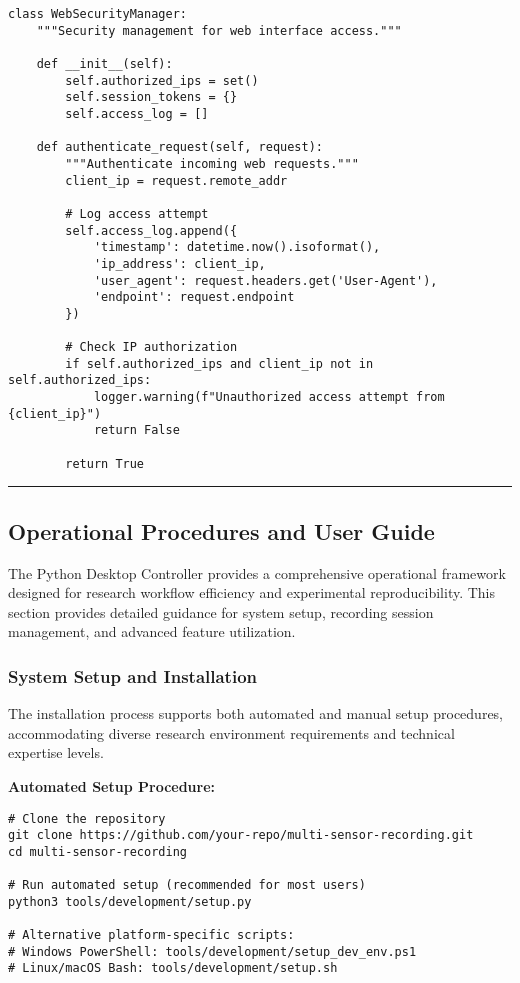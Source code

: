 \documentclass[11pt,a4paper]{article}
\begin{document}
\begin{verbatim}
class WebSecurityManager:
    """Security management for web interface access."""

    def __init__(self):
        self.authorized_ips = set()
        self.session_tokens = {}
        self.access_log = []

    def authenticate_request(self, request):
        """Authenticate incoming web requests."""
        client_ip = request.remote_addr

        # Log access attempt
        self.access_log.append({
            'timestamp': datetime.now().isoformat(),
            'ip_address': client_ip,
            'user_agent': request.headers.get('User-Agent'),
            'endpoint': request.endpoint
        })

        # Check IP authorization
        if self.authorized_ips and client_ip not in self.authorized_ips:
            logger.warning(f"Unauthorized access attempt from {client_ip}")
            return False

        return True
\end{verbatim}

\hrule

\subsection{Operational Procedures and User Guide}

The Python Desktop Controller provides a comprehensive operational framework designed for research workflow efficiency
and experimental reproducibility. This section provides detailed guidance for system setup, recording session
management, and advanced feature utilization.

\subsubsection{System Setup and Installation}

The installation process supports both automated and manual setup procedures, accommodating diverse research environment
requirements and technical expertise levels.

\textbf{Automated Setup Procedure:}

\begin{verbatim}
# Clone the repository
git clone https://github.com/your-repo/multi-sensor-recording.git
cd multi-sensor-recording

# Run automated setup (recommended for most users)
python3 tools/development/setup.py

# Alternative platform-specific scripts:
# Windows PowerShell: tools/development/setup_dev_env.ps1
# Linux/macOS Bash: tools/development/setup.sh
\end{verbatim}
\end{document}
